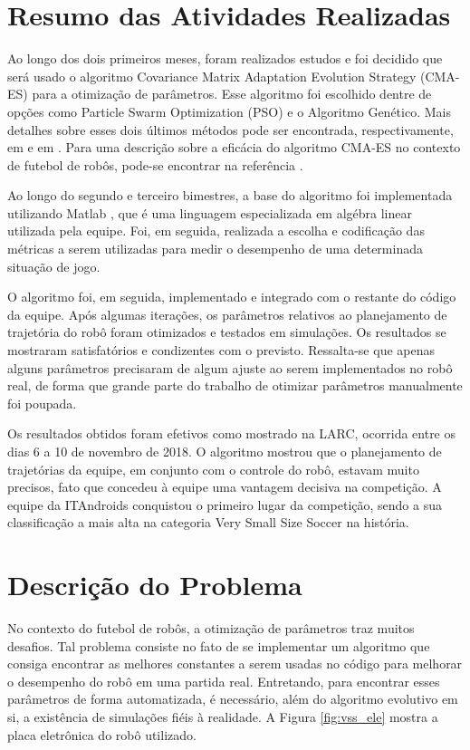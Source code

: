 \documentclass[a4paper,12pt]{article}
\begin{document}
\section{Resumo das Atividades Realizadas}
\label{secao:atividades_realizadas}

Ao longo dos dois primeiros meses, foram realizados estudos e foi decidido que será usado o algoritmo Covariance Matrix Adaptation Evolution Strategy (CMA-ES) para a otimização de parâmetros. Esse algoritmo foi escolhido dentre de opções como Particle Swarm Optimization (PSO) e o Algoritmo Genético. Mais detalhes sobre esses dois últimos métodos pode ser encontrada, respectivamente, em \cite{PSO} e em \cite{genetico}. Para uma descrição sobre a eficácia do algoritmo CMA-ES no contexto de futebol de robôs, pode-se encontrar na referência \cite{CMA-ES-Soccer}.

Ao longo do segundo e terceiro bimestres, a base do algoritmo foi implementada utilizando Matlab \cite{matlab}, que é uma linguagem especializada em algébra linear utilizada pela equipe. Foi, em seguida, realizada a escolha e codificação das métricas a serem utilizadas para medir o desempenho de uma determinada situação de jogo.

O algoritmo foi, em seguida, implementado e integrado com o restante do código da equipe. Após algumas iterações, os parâmetros relativos ao planejamento de trajetória do robô foram otimizados e testados em simulações. Os resultados se mostraram satisfatórios e condizentes com o previsto. Ressalta-se que apenas alguns parâmetros precisaram de algum ajuste ao serem implementados no robô real, de forma que grande parte do trabalho de otimizar parâmetros manualmente foi poupada.

Os resultados obtidos foram efetivos como mostrado na LARC, ocorrida entre os dias 6 a 10 de novembro de 2018. O algoritmo mostrou que o planejamento de trajetórias da equipe, em conjunto com o controle do robô, estavam muito precisos, fato que concedeu à equipe uma vantagem decisiva na competição. A equipe da ITAndroids conquistou o primeiro lugar da competição, sendo a sua classificação a mais alta  na categoria Very Small Size Soccer na história.
\section{Descrição do Problema}
\label{secao:enunciado_problema}

No contexto do futebol de robôs, a otimização de parâmetros traz muitos desafios. Tal problema consiste no fato de se implementar um algoritmo que consiga encontrar as melhores constantes a serem usadas no código para melhorar o desempenho do robô em uma partida real. Entretando, para encontrar esses parâmetros de forma automatizada, é necessário, além do algoritmo evolutivo em si, a existência de simulações fiéis à realidade. A Figura \ref{fig:vss_ele} mostra a placa eletrônica do robô utilizado.
\end{document}
